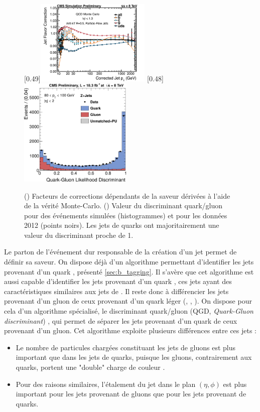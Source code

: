 \begin{figure}[tbp] \centering
    \subcaptionbox{\label{fig:flavor_response}}[0.49\textwidth]{\includegraphics[width=0.49\textwidth]{chapitre4/figs/flavor_response.pdf}}
    \subcaptionbox{\label{fig:qgd}}[0.48\textwidth]{\includegraphics[width=0.48\textwidth]{chapitre4/figs/qgd.pdf}}
    \caption{() Facteurs de corrections dépendants de la saveur dérivées à l'aide de la vérité Monte-Carlo. () Valeur du discriminant quark\-/gluon pour des événements simulées (histogrammes) et pour les données 2012 (points noirs). Les jets de quarks ont majoritairement une valeur du discriminant proche de 1.}
\end{figure}

Le parton de l'événement dur responsable de la création d'un jet permet de définir sa saveur. On dispose déjà d'un algorithme permettant d'identifier les jets provenant d'un quark \Pbottom, présenté \cref{sec:b_tagging}. Il s'avère que cet algorithme est aussi capable d'identifier les jets provenant d'un quark \Pcharm, ces jets ayant des caractéristiques similaires aux jets de \Pbottom. Il reste donc à différencier les jets provenant d'un gluon de ceux provenant d'un quark léger (\Pup, \Pdown, \Pstrange). On dispose pour cela d'un algorithme spécialisé, le discriminant quark\-/gluon (QGD, \emph{Quark-Gluon discriminant}) \citep{CMS-PAS-JME-13-002}, qui permet de séparer les jets provenant d'un quark de ceux provenant d'un gluon. Cet algorithme exploite plusieurs différences entre ces jets :
\begin{itemize}
  \item Le nombre de particules chargées constituant les jets de gluons est plus important que dans les jets de quarks, puisque les gluons, contrairement aux quarks, portent une "double" charge de couleur \citep{Dremin:2000wt}.
  \item Pour des raisons similaires, l'étalement du jet dans le plan $(\eta, \phi)$ est plus important pour les jets provenant de gluons que pour les jets provenant de quarks.
\end{itemize}

